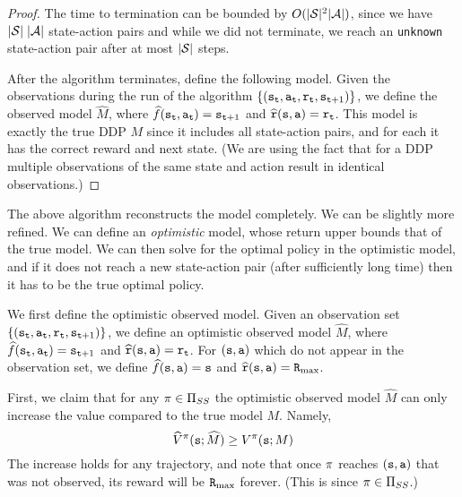 \begin{proof}
The time to termination can be bounded by  $O(|\mathcal{S}|^2 |\mathcal{A}|)$, since we have  $|\mathcal{S}|\; |\mathcal{A}|$ state-action pairs and while we did not terminate, we reach an \texttt{unknown} state-action pair after at most  $|\mathcal{S}|$ steps.

After the algorithm terminates, define the following model. Given
the observations during the run of the algorithm
$\{({\tt s}_{\tt t},{\tt a}_{\tt t} ,{\tt r}_{\tt t},
{\tt s}_{{\tt t}+1})\}$, we define the observed model $\widehat{M}$,
where $\widehat{f}({\tt s}_{\tt t},{\tt a}_{\tt t})={\tt s}_{{\tt t}+1}$
and $\widehat{{\tt r}}({\tt s},{\tt a})={\tt r}_{\tt t}$. This model
is exactly the true DDP $M$ since it includes all state-action
pairs, and for each it has the correct reward and next state. (We
are using the fact that for a DDP multiple observations of the same
state and action result in identical observations.)
\end{proof}

The above algorithm reconstructs the model completely. We can be
slightly more refined. We can define an {\em optimistic} model, whose
return upper bounds that of the true model. We can then solve for
the optimal policy in the optimistic model, and if it does not reach a new state-action pair (after sufficiently long time) then it
has to be the true optimal policy.

We first define the optimistic observed model. Given an observation
set $\{({\tt s}_{\tt t},{\tt a}_{\tt t} ,{\tt r}_{\tt t},
{\tt s}_{{\tt t}+1})\}$, we define an optimistic observed model
$\widehat{M}$, where
$\widehat{f}({\tt s}_{\tt t},{\tt a}_{\tt t})={\tt s}_{{\tt t}+1}$ and
$\widehat{{\tt r}}({\tt s},{\tt a})={\tt r}_{\tt t}$.
%
For $({\tt s},{\tt a})$ which do not appear in the observation set,
we define $\widehat{f}({\tt s},{\tt a})={\tt s}$ and
$\widehat{{\tt r}}({\tt s},{\tt a})={\tt R}_{\max }$.

First, we claim that for any $\pi\in {\Pi _{SS}}$ the optimistic
observed model $\widehat{M}$ can only increase the value compared to
the true model $M$. Namely,
\[
\widehat{V}^\pi({\tt s};\widehat{M})\geq V^\pi({\tt s};M)
\]
The increase holds for any trajectory, and note that once $\pi$
reaches $({\tt s},{\tt a})$ that was not observed, its reward will be
${\tt R}_{\max }$ forever. (This is since $\pi\in {\Pi _{SS}}$.)

